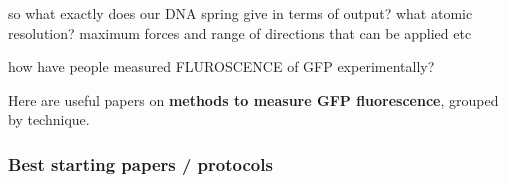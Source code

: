 \documentclass{article}
\begin{document}
\begin{question}
 so what exactly does our DNA spring give in terms of output? what atomic resolution? maximum forces and range of directions that can be applied etc 
\end{question}

\begin{question}
how have people measured FLUROSCENCE of GFP experimentally? 
\end{question}

Here are useful papers on \textbf{methods to measure GFP fluorescence}, grouped by technique.

\subsubsection*{Best starting papers / protocols}
\end{document}
